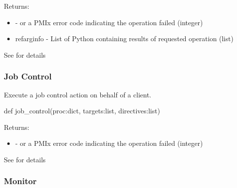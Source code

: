 \begin{arglist}
\end{arglist}

Returns:
\begin{itemize}
    \item {} -  or a \ac{PMIx} error code indicating the operation failed (integer)
    \item refarg{info} - List of Python  containing results of requested operation (list)
\end{itemize}

See  for details


\subsubsection{Job Control}

\summary

Execute a job control action on behalf of a client.

\format

\pyspecificstart
\begin{codepar}
def job_control(proc:dict, targets:list, directives:list)
\end{codepar}
\pyspecificend

\begin{arglist}
\end{arglist}

Returns:
\begin{itemize}
    \item {} -  or a \ac{PMIx} error code indicating the operation failed (integer)
\end{itemize}

See  for details


\subsubsection{Monitor}

